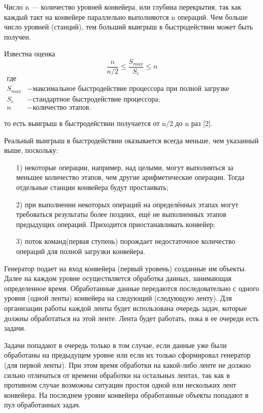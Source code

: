 \documentclass[a4paper, 14pt]{article}
\begin{document}
Число n — количество уровней конвейера, или глубина перекрытия, так как каждый такт на конвейере параллельно выполняются n операций. Чем больше число уровней (станций), тем больший выигрыш в быстродействии может быть получен.

Известна оценка
\begin{equation}\label{form:way}
{\frac{n}{n/2} \leq {\frac{S_{max}}{S_{e}}} \leq n}
 \end{equation}
 \begin{align*}
    \text{где} \\
    S_{max} &- \text{максимальное быстродействие процессора  при полной загрузке конвейера;} \\
    S_{e} &- \text{стандартное быстродействие процессора;} \\
   n &- \text{количество этапов.}
\end{align*}

то есть выигрыш в быстродействии получается от n/2  до n раз [2].


Реальный выигрыш в быстродействии оказывается всегда меньше, чем указанный выше, поскольку:

\begin{enumerate}
\item[1)] некоторые операции, например, над целыми, могут выполняться за меньшее количество этапов, чем другие арифметические операции. Тогда отдельные станции конвейера будут простаивать;
\item[2)] при выполнении некоторых операций на определённых этапах могут требоваться результаты более поздних, ещё не выполненных этапов предыдущих операций. Приходится приостанавливать конвейер;
\item[3)] поток команд(первая ступень) порождает недостаточное количество операций для полной загрузки конвейера.
\end{enumerate}


 Генератор подает на вход конвейера (первый уровень) созданные им объекты. Далее на каждом уровне осуществляется обработка данных, занимающая определенное время. Обработанные данные передаются последовательно с одного уровня (одной ленты) конвейера на следующий (следующую ленту). Для организации работы каждой ленты будет использована очередь задач, которые должны обработаться на этой ленте. Лента будет работать, пока в ее очереди есть задачи. 
 
 Задачи попадают в очередь только в том случае, если данные уже были обработаны на предыдущем уровне или если их только сформировал генератор (для первой ленты). При этом время обработки на какой-либо ленте не должно сильно отличаться от времени обработки на остальных лентах, так как в противном случае возможны ситуации простоя одной или нескольких лент конвейера. На последнем уровне конвейера обработанные объекты попадают в пул обработанных задач.
\end{document}
